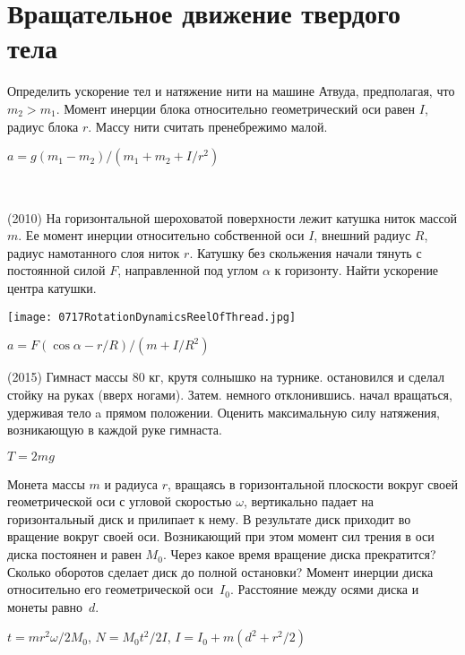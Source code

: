 \section{Вращательное движение твердого тела}

\begin{ex}
Определить ускорение тел и натяжение нити на машине Атвуда, предполагая, что $m_2>m_1$. Момент инерции блока относительно геометрический оси равен $I$, радиус блока $r$. Массу нити считать пренебрежимо малой. 
\begin{ans}
$a=g(m_1-m_2)/(m_1 +m_2 + I/r^2)$
\end{ans}
\end{ex}

\begin{ex}
\hspace{0pt} \\
\begin{minipage}{.65\textwidth}
(2010) На горизонтальной шероховатой поверхности лежит катушка ниток массой $m$. Ее момент инерции относительно собственной оси $I$, внешний радиус $R$, радиус намотанного слоя ниток $r$. Катушку без скольжения начали тянуть с постоянной силой $F$, направленной под углом $\alpha$ к горизонту. Найти ускорение центра катушки.
\end{minipage}
\begin{minipage}{.35\textwidth}
\centering
\texttt{[image: 0717RotationDynamicsReelOfThread.jpg]}
\end{minipage}
\begin{ans}
$a = F(\cos \alpha - r/R)/(m+I/R^2)$
\end{ans}
\end{ex}

\begin{ex}
(2015) Гимнаст массы 80 кг, крутя солнышко на турнике. остановился и сделал стойку на руках (вверх ногами). Затем. немного отклонившись. начал вращаться, удерживая тело a прямом положении. Оценить максимальную силу натяжения, возникающую в каждой руке гимнаста.
\begin{ans}
$T=2mg$
\end{ans}
\end{ex}

\begin{ex}
Монета массы $m$ и радиуса $r$, вращаясь в горизонтальной плоскости вокруг своей геометрической оси с угловой скоростью $\omega$, вертикально падает на горизонтальный диск и прилипает к нему. В результате диск приходит во вращение вокруг своей оси. Возникающий при этом момент сил трения в оси диска постоянен и равен $M_0$. Через какое время вращение диска прекратится? Сколько оборотов сделает диск до полной остановки? Момент инерции диска относительно его геометрической оси~$I_0$. Расстояние между осями диска и монеты равно~$d$.
\begin{ans}
$t=mr^2\omega/2M_0$, $N=M_0t^2/2I$, $I = I_0+m(d^2+r^2/2)$
\end{ans}
\end{ex}

